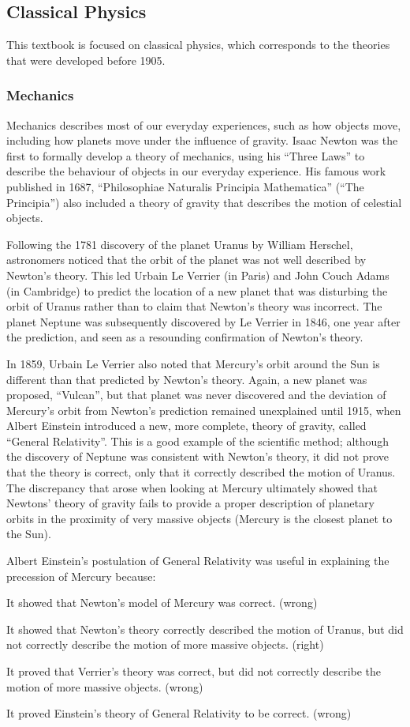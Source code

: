 \subsection{Classical Physics}
This textbook is focused on classical physics, which corresponds to the theories that were developed before 1905.
\subsubsection{Mechanics}
Mechanics describes most of our everyday experiences, such as how objects move, including how planets move under the influence of gravity. Isaac Newton was the first to formally develop a theory of mechanics, using his ``Three Laws'' to describe the behaviour of objects in our everyday experience. His famous work published in 1687, ``Philosophiae Naturalis Principia Mathematica'' (``The Principia'') also included a theory of gravity that describes the motion of celestial objects. 

Following the 1781 discovery of the planet Uranus by William Herschel, astronomers noticed that the orbit of the planet was not well described by Newton's theory. This led Urbain Le Verrier (in Paris) and John Couch Adams (in Cambridge) to predict the location of a new planet that was disturbing the orbit of Uranus rather than to claim that Newton's theory was incorrect. The planet Neptune was subsequently discovered by Le Verrier in 1846, one year after the prediction, and seen as a resounding confirmation of Newton's theory. 

In 1859, Urbain Le Verrier also noted that Mercury's orbit around the Sun is different than that predicted by Newton's theory. Again, a new planet was proposed, ``Vulcan'', but that planet was never discovered and the deviation of Mercury's orbit from Newton's prediction remained unexplained until 1915, when Albert Einstein introduced a new, more complete, theory of gravity, called ``General Relativity''. This is a good example of the scientific method; although the discovery of Neptune was consistent with Newton's theory, it did not prove that the theory is correct, only that it correctly described the motion of Uranus. The discrepancy that arose when looking at Mercury ultimately showed that Newtons' theory of gravity fails to provide a proper description of planetary orbits in the proximity of very massive objects (Mercury is the closest planet to the Sun). 

\begin{checkpointMC}{Albert Einstein's postulation of General Relativity was useful in explaining the precession of Mercury because:}
\item It showed that Newton's model of Mercury was correct. (wrong)
\item It showed that Newton's theory correctly described the motion of Uranus, but did not correctly describe the motion of more massive objects. (right)
\item It proved that Verrier's theory was correct, but did not correctly describe the motion of more massive objects. (wrong)
\item It proved Einstein's theory of General Relativity to be correct. (wrong)
\end{checkpointMC}
 

